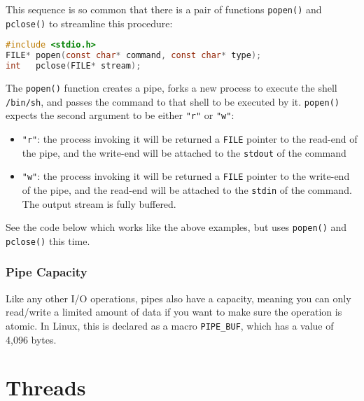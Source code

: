 \documentclass{article}
\renewcommand{\b}{\item[$\circ$]}
\newcommand{\newlist}{\begin{itemize}}
\renewcommand{\endlist}{\end{itemize}}
\newcommand{\code}[1]{\texttt{#1}}
\begin{document}
This sequence is so common that there is a pair of functions \code{popen()} and \code{pclose()} to streamline this procedure:

\begin{lstlisting}[language=C]
#include <stdio.h>
FILE* popen(const char* command, const char* type);
int   pclose(FILE* stream);
\end{lstlisting}

The \code{popen()} function creates a pipe, forks a new process to execute the shell \code{/bin/sh}, and passes the command to that shell to be executed by it. \code{popen()} expects the second argument to be either \code{"r"} or \code{"w"}:

\newlist 
\b \code{"r"}: the process invoking it will be returned a \code{FILE} pointer to the read-end of the pipe, and the write-end will be attached to the \code{stdout} of the command
\b \code{"w"}: the process invoking it will be returned a \code{FILE} pointer to the write-end of the pipe, and the read-end will be attached to the \code{stdin} of the command. The output stream is fully buffered. 
\endlist

See the code below which works like the above examples, but uses \code{popen()} and \code{pclose()} this time.



\subsubsection{Pipe Capacity}

Like any other I/O operations, pipes also have a capacity, meaning you can only read/write a limited amount of data if you want to make sure the operation is atomic. In Linux, this is declared as a macro \code{PIPE\_BUF}, which has a value of 4,096 bytes. 

\newpage
\section{Threads}
\end{document}
